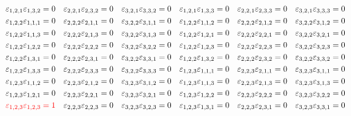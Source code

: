 \documentclass[12pt]{article}
\begin{document}
\begin{equation}
\begin{aligned}
&&\varepsilon_{1,2,1}\varepsilon_{1,3,2}=0&&\varepsilon_{2,2,1}\varepsilon_{2,3,2}=0&&\varepsilon_{3,2,1}\varepsilon_{3,3,2}=0&&\varepsilon_{1,2,1}\varepsilon_{1,3,3}=0&&\varepsilon_{2,2,1}\varepsilon_{2,3,3}=0&&\varepsilon_{3,2,1}\varepsilon_{3,3,3}=0\\
&&\varepsilon_{1,2,2}\varepsilon_{1,1,1}=0&&\varepsilon_{2,2,2}\varepsilon_{2,1,1}=0&&\varepsilon_{3,2,2}\varepsilon_{3,1,1}=0&&\varepsilon_{1,2,2}\varepsilon_{1,1,2}=0&&\varepsilon_{2,2,2}\varepsilon_{2,1,2}=0&&\varepsilon_{3,2,2}\varepsilon_{3,1,2}=0\\
&&\varepsilon_{1,2,2}\varepsilon_{1,1,3}=0&&\varepsilon_{2,2,2}\varepsilon_{2,1,3}=0&&\varepsilon_{3,2,2}\varepsilon_{3,1,3}=0&&\varepsilon_{1,2,2}\varepsilon_{1,2,1}=0&&\varepsilon_{2,2,2}\varepsilon_{2,2,1}=0&&\varepsilon_{3,2,2}\varepsilon_{3,2,1}=0\\
&&\varepsilon_{1,2,2}\varepsilon_{1,2,2}=0&&\varepsilon_{2,2,2}\varepsilon_{2,2,2}=0&&\varepsilon_{3,2,2}\varepsilon_{3,2,2}=0&&\varepsilon_{1,2,2}\varepsilon_{1,2,3}=0&&\varepsilon_{2,2,2}\varepsilon_{2,2,3}=0&&\varepsilon_{3,2,2}\varepsilon_{3,2,3}=0\\
&&\varepsilon_{1,2,2}\varepsilon_{1,3,1}=0&&\varepsilon_{2,2,2}\varepsilon_{2,3,1}=0&&\varepsilon_{3,2,2}\varepsilon_{3,3,1}=0&&\varepsilon_{1,2,2}\varepsilon_{1,3,2}=0&&\varepsilon_{2,2,2}\varepsilon_{2,3,2}=0&&\varepsilon_{3,2,2}\varepsilon_{3,3,2}=0\\
&&\varepsilon_{1,2,2}\varepsilon_{1,3,3}=0&&\varepsilon_{2,2,2}\varepsilon_{2,3,3}=0&&\varepsilon_{3,2,2}\varepsilon_{3,3,3}=0&&\varepsilon_{1,2,3}\varepsilon_{1,1,1}=0&&\varepsilon_{2,2,3}\varepsilon_{2,1,1}=0&&\varepsilon_{3,2,3}\varepsilon_{3,1,1}=0\\
&&\varepsilon_{1,2,3}\varepsilon_{1,1,2}=0&&\varepsilon_{2,2,3}\varepsilon_{2,1,2}=0&&\varepsilon_{3,2,3}\varepsilon_{3,1,2}=0&&\varepsilon_{1,2,3}\varepsilon_{1,1,3}=0&&\varepsilon_{2,2,3}\varepsilon_{2,1,3}=0&&\varepsilon_{3,2,3}\varepsilon_{3,1,3}=0\\
&&\varepsilon_{1,2,3}\varepsilon_{1,2,1}=0&&\varepsilon_{2,2,3}\varepsilon_{2,2,1}=0&&\varepsilon_{3,2,3}\varepsilon_{3,2,1}=0&&\varepsilon_{1,2,3}\varepsilon_{1,2,2}=0&&\varepsilon_{2,2,3}\varepsilon_{2,2,2}=0&&\varepsilon_{3,2,3}\varepsilon_{3,2,2}=0\\
&&{\color{red}\varepsilon_{1,2,3}\varepsilon_{1,2,3}=1}
&&\varepsilon_{2,2,3}\varepsilon_{2,2,3}=0&&\varepsilon_{3,2,3}\varepsilon_{3,2,3}=0&&\varepsilon_{1,2,3}\varepsilon_{1,3,1}=0&&\varepsilon_{2,2,3}\varepsilon_{2,3,1}=0&&\varepsilon_{3,2,3}\varepsilon_{3,3,1}=0\\

\end{aligned}
\end{equation}
\end{document}
